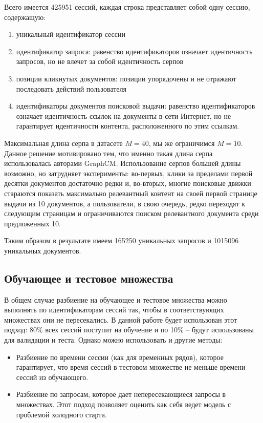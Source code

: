 \documentclass[diploma]{nanolab2015}
\begin{document}
Всего имеется 425951 сессий, каждая строка представляет собой одну сессию, содержащую:

\begin{enumerate}
    \item уникальный идентификатор сессии
    \item идентификатор запроса: равенство идентификаторов означает идентичность запросов, но не влечет за собой идентичность серпов
    \item позиции кликнутых документов: позиции упорядочены и не отражают последовать действий пользователя
    \item идентификаторы документов поисковой выдачи: равенство идентификаторов означает идентичность ссылок на документы в сети Интернет, но не гарантирует идентичности контента, расположенного по этим ссылкам.
\end{enumerate}

Максимальная длина серпа в датасете $M = 40$, мы же ограничимся $M = 10$. Данное решение мотивировано тем, что именно такая длина серпа использовалась авторами GraphCM. Использование серпов большей длины возможно, но затрудняет эксперименты: во-первых, клики за пределами первой десятки документов достаточно редки и, во-вторых, многие поисковые движки стараются показать максимально релевантный контент на своей первой странице выдачи из 10 документов, а пользователи, в свою очередь, редко переходят к следующим страницам и ограничиваются поиском релевантного документа среди предложенных 10.

Таким образом в результате имеем 165250 уникальных запросов и 1015096 уникальных документов.

\subsection{Обучающее и тестовое множества}
В общем случае разбиение на обучающее и тестовое множества можно выполнять по идентификаторам сессий так, чтобы в соответствующих множествах они не пересекались. В данной работе будет использован этот подход: 80\% всех сессий поступит на обучение и по 10\% -- будут использованы для валидации и теста. Однако можно использовать и другие методы:
\begin{itemize}
    \item Разбиение по времени сессии (как для временных рядов), которое гарантирует, что время сессий в тестовом множестве не меньше времени сессий из обучающего.
    \item Разбиение по запросам, которое дает непересекающиеся запросы в множествах. Этот подход позволяет оценить как себя ведет модель с проблемой холодного старта.
\end{itemize}
\end{document}
